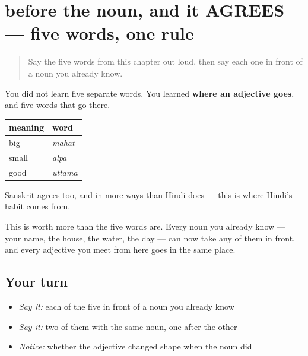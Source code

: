 \section[before the noun, and it AGREES]{before the noun, and it AGREES — five words, one rule}

\label{lesson:SA-C15-adjective-system}



\begin{quote}
Say the five words from this chapter out loud, then say each one in front of a noun you already know.
\end{quote}

\begin{grammarlens}[title={Grammar lens: where an adjective goes}]
You did not learn five separate words. You learned \textbf{where an adjective goes}, and five words that go there.

\noindent
\begin{tabularx}{\linewidth}{@{}>{\raggedright\arraybackslash}X>{\raggedright\arraybackslash}X@{}}
\toprule
\textbf{meaning} & \textbf{word} \\
\midrule
big & \textbf{\sk{महत्}} \emph{mahat} \\
small & \textbf{\sk{अल्प}} \emph{alpa} \\
good & \textbf{\sk{उत्तम}} \emph{uttama} \\
\bottomrule
\end{tabularx}

Sanskrit agrees too, and in more ways than Hindi does — this is where Hindi's habit comes from.

This is worth more than the five words are. Every noun you already know — your name, the house, the water, the day — can now take any of them in front, and every adjective you meet from here goes in the same place.
\end{grammarlens}

\subsection*{Your turn}
\begin{itemize}
\raggedright
  \item \emph{Say it:} each of the five in front of a noun you already know
  \item \emph{Say it:} two of them with the same noun, one after the other
  \item \emph{Notice:} whether the adjective changed shape when the noun did
\end{itemize}

